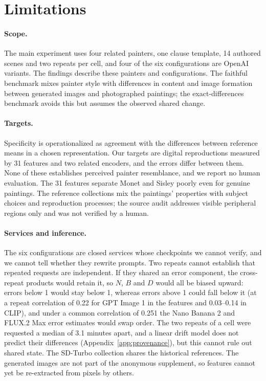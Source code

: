 \documentclass[10pt]{article}
\begin{document}
\section{Limitations}\label{sec:limitations}

\paragraph{Scope.} The main experiment uses four related painters, one clause template, 14 authored
scenes and two repeats per cell, and four of the six configurations are OpenAI variants. The
findings describe these painters and configurations. The faithful benchmark mixes painter style with
differences in content and image formation between generated images and photographed paintings; the
exact-differences benchmark avoids this but assumes the observed shared change.

\paragraph{Targets.} Specificity is operationalized as agreement with the differences between
reference means in a chosen representation. Our targets are digital reproductions measured by 31
features and two related encoders, and the errors differ between them. None of these establishes
perceived painter resemblance, and we report no human evaluation. The 31 features separate Monet
and Sisley poorly even for genuine paintings. The reference collections mix the paintings'
properties with subject choices and reproduction processes; the source audit addresses visible
peripheral regions only and was not verified by a human.

\paragraph{Services and inference.} The six configurations are closed services whose checkpoints
we cannot verify, and we cannot tell whether they rewrite prompts. Two repeats cannot establish that
repeated requests are independent. If they shared an error component, the cross-repeat products
would retain it, so $N$, $B$ and $D$ would all be biased upward: errors below 1 would stay below 1,
whereas errors above 1 could fall below it (at a repeat correlation of 0.22 for GPT Image 1 in the
features and 0.03--0.14 in CLIP), and under a common correlation of 0.251 the Nano Banana 2 and
FLUX.2 Max error estimates would swap order. The two repeats of a cell were requested a median of
3.1 minutes apart, and a linear drift model does not predict their differences
(Appendix~\ref{app:provenance}), but this cannot rule out shared state. The SD-Turbo collection
shares the historical references. The generated images are not part of the anonymous supplement, so
features cannot yet be re-extracted from pixels by others.
\end{document}
